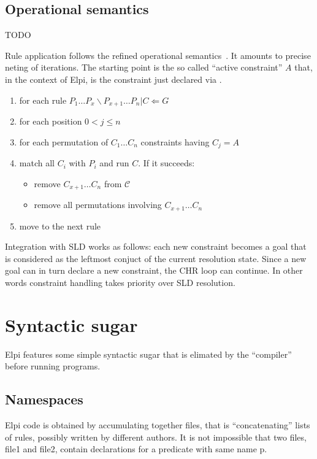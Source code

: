 \documentclass[a4paper, 11pt]{book}
\begin{document}
\subsection{Operational semantics}\label{sec:sem}

TODO \cite{TASSI_2019}


 
Rule application follows the refined operational semantics~\cite{10.1007/978-3-540-27775-0_7}.
It amounts to precise neting of iterations. The starting point is
the so called ``active constraint'' $A$ that, in the context of Elpi, is
the constraint just declared via .

\begin{enumerate}
\item for each rule $P_1 \ldots P_x \backslash P_{x+1} \ldots P_n | C \Leftarrow G$
\item for each position $0 < j \leq n$
\item for each permutation of $C_1 \ldots C_n$ constraints having $C_j = A$
\item match all $C_i$ with $P_i$ and run $C$. If it succeeds:
  \begin{itemize}
    \item remove $C_{x+1} \ldots C_n$ from $\mathcal{C}$
    \item remove all permutations involving $C_{x+1} \ldots C_n$
  \end{itemize}
\item move to the next rule
\end{enumerate}

Integration with SLD works as follows: each new constraint becomes
a goal that is considered as the leftmost conjuct of the current
resolution state. Since a new goal can in turn declare a new constraint,
the CHR loop can continue. In other words constraint handling takes
priority over SLD resolution.

\section{Syntactic sugar}

Elpi features some simple syntactic sugar that is elimated by
the ``compiler'' before running programs.

\subsection{Namespaces}

Elpi code is obtained by accumulating together files, that is
``concatenating'' lists of rules, possibly written by different
authors. It is not impossible that
two files, file1 and file2, contain declarations for a predicate with same name p.
\end{document}
